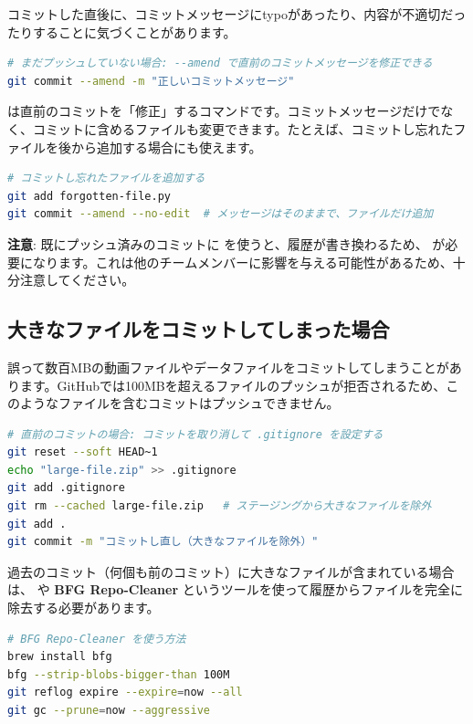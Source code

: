 コミットした直後に、コミットメッセージにtypoがあったり、内容が不適切だったりすることに気づくことがあります。

\begin{lstlisting}[language=bash]
# まだプッシュしていない場合: --amend で直前のコミットメッセージを修正できる
git commit --amend -m "正しいコミットメッセージ"
\end{lstlisting}

 は直前のコミットを「修正」するコマンドです。コミットメッセージだけでなく、コミットに含めるファイルも変更できます。たとえば、コミットし忘れたファイルを後から追加する場合にも使えます。

\begin{lstlisting}[language=bash]
# コミットし忘れたファイルを追加する
git add forgotten-file.py
git commit --amend --no-edit  # メッセージはそのままで、ファイルだけ追加
\end{lstlisting}

\textbf{注意}: 既にプッシュ済みのコミットに  を使うと、履歴が書き換わるため、 が必要になります。これは他のチームメンバーに影響を与える可能性があるため、十分注意してください。

\subsection{大きなファイルをコミットしてしまった場合}

誤って数百MBの動画ファイルやデータファイルをコミットしてしまうことがあります。GitHubでは100MBを超えるファイルのプッシュが拒否されるため、このようなファイルを含むコミットはプッシュできません。

\begin{lstlisting}[language=bash]
# 直前のコミットの場合: コミットを取り消して .gitignore を設定する
git reset --soft HEAD~1
echo "large-file.zip" >> .gitignore
git add .gitignore
git rm --cached large-file.zip   # ステージングから大きなファイルを除外
git add .
git commit -m "コミットし直し（大きなファイルを除外）"
\end{lstlisting}

過去のコミット（何個も前のコミット）に大きなファイルが含まれている場合は、 や \textbf{BFG Repo-Cleaner} というツールを使って履歴からファイルを完全に除去する必要があります。

\begin{lstlisting}[language=bash]
# BFG Repo-Cleaner を使う方法
brew install bfg
bfg --strip-blobs-bigger-than 100M
git reflog expire --expire=now --all
git gc --prune=now --aggressive
\end{lstlisting}

